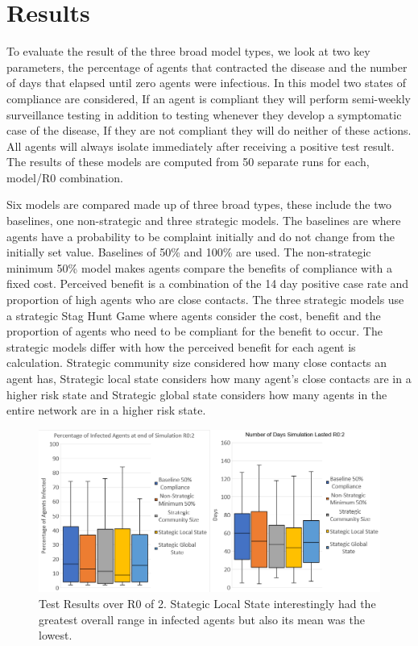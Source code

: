 \documentclass{article}
\begin{document}
\section{Results}

To evaluate the result of the three broad model types, we look at two key parameters, the percentage of agents that contracted the disease and the number of days that elapsed until zero agents were infectious.  In this model two states of compliance are considered, If an agent is compliant they will perform semi-weekly surveillance testing in addition to testing whenever they develop a symptomatic case of the disease, If they are not compliant they will do neither of these actions. All agents will always isolate immediately after receiving a positive test result. The results of these models are computed from 50 separate runs for each, model/R0 combination. \newline

Six models are compared made up of three broad types, these include the two baselines, one non-strategic and three strategic models. The baselines are where agents have a probability to be complaint initially and do not change from the initially set value. Baselines of 50\% and 100\% are used. The non-strategic minimum 50\% model makes agents compare the benefits of compliance with a fixed cost. Perceived benefit is a combination of the 14 day positive case rate and proportion of high agents who are close contacts. The three strategic models use a strategic Stag Hunt Game where agents consider the cost, benefit and the proportion of agents who need to be compliant for the benefit to occur. The strategic models differ with how the perceived benefit for each agent is calculation. Strategic community size considered how many close contacts an agent has, Strategic local state considers how many agent’s close contacts are in a higher risk state and Strategic global state considers how many agents in the entire network are in a higher risk state.

\newpage

\begin{figure}[h!]
\centering
\includegraphics[width=\textwidth]{5}
\caption{Test Results over R0 of 2. Stategic Local State interestingly had the greatest overall range in infected agents but also its mean was the lowest.}
\end{figure}
\end{document}
